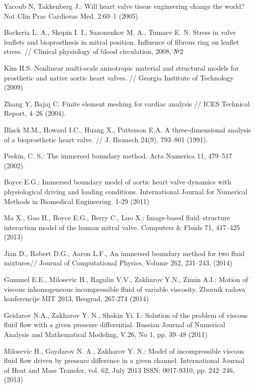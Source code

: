 \documentclass[conference]{IEEEtran}
\begin{document}
\begin{thebibliography}{1}

 Yacoub N, Takkenberg J.: Will heart valve tissue engineering change the world? Nat Clin Prac Cardiovas Med. 2:60--1 (2005)

 Bockeria L. A., Skopin I. I., Sazonenkov M. A., Tumaev E. N. Stress in valve leaflets and bioprosthesis in mitral position. Influence of fibrous ring on leaflet stress. // Clinical physiology of blood circulation, 2008, №2

 Kim H.S. Nonlinear multi-scale anisotropic material and structural models for 
prosthetic and native aortic heart valves. // Georgia Institute of Technology 
(2009) 

 Zhang Y, Bajaj C. Finite element meshing for cardiac analysis // ICES 
Technical Report, 4–26 (2004). 

 Black M.M., Howard I.C., Huang X., Patterson E.A. A three-dimensional 
analysis of a bioprosthetic heart valve. // J. Biomech 24(9), 793–801 (1991). 

 Peskin, C. S.: The immersed boundary method. Acta Numerica 11, 479–517 (2002).

 Boyce E.G.: Immersed boundary model of aortic heart valve dynamics with physiological driving and loading conditions. International Journal for Numerical Methods in Biomedical Engineering. 1-29 (2011)

 Ma X., Gao H., Boyce E.G., Berry C., Luo X.: Image-based fluid–structure interaction model of the human mitral valve. Computers \& Fluids 71, 417–425 (2013)

 Jian D., Robert D.G., Aaron L.F., An immersed boundary method for two fluid mixtures// Journal of Computational Physics, Volume 262, 231--243, (2014)

 Gummel E.E., Milosevic H., Ragulin V.V., Zakharov Y.N., Zimin A.I.: Motion of viscous inhomogeneous incompressible fluid of variable viscosity. Zbornik radova konferencije MIT 2013, Beograd, 267-274 (2014)

 Geidarov N.A., Zakharov Y. N.,  Shokin Yi. I.: Solution of the problem of viscous fluid flow with a given pressure differential. Russian Journal of Numerical Analysis and Mathematical Modeling, V.26, No 1, pp. 39--48 (2011)

 Milosevic H., Gaydarov N. A., Zakharov Y. N.: Model of incompressible viscous fluid flow driven by  pressure difference in a given channel. International Journal of Heat and Mass Transfer, vol. 62, July 2013 ISSN: 0017-9310, pp. 242--246, (2013)


\end{thebibliography}
\end{document}
